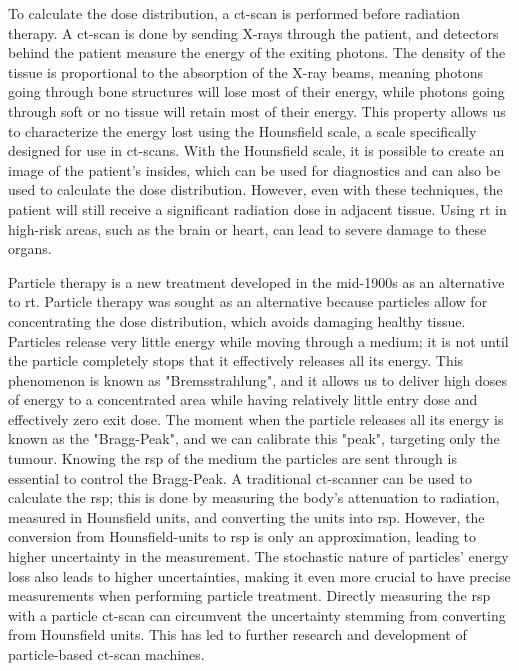 \documentclass[main.tex]{subfiles}
\begin{document}
To calculate the dose distribution, a \gls{ct}-scan is performed before radiation therapy. A \gls{ct}-scan is done by sending X-rays through the patient, and detectors behind the patient measure the energy of the exiting photons. The density of the tissue is proportional to the absorption of the X-ray beams, meaning photons going through bone structures will lose most of their energy, while photons going through soft or no tissue will retain most of their energy. This property allows us to characterize the energy lost using the Hounsfield scale, a scale specifically designed for use in \gls{ct}-scans. With the Hounsfield scale, it is possible to create an image of the patient's insides, which can be used for diagnostics and can also be used to calculate the dose distribution. However, even with these techniques, the patient will still receive a significant radiation dose in adjacent tissue. Using \gls{rt} in high-risk areas, such as the brain or heart, can lead to severe damage to these organs.  \par

Particle therapy is a new treatment developed in the mid-1900s as an alternative to \gls{rt}. Particle therapy was sought as an alternative because particles allow for concentrating the dose distribution, which avoids damaging healthy tissue. Particles release very little energy while moving through a medium; it is not until the particle completely stops that it effectively releases all its energy. This phenomenon is known as "Bremsstrahlung", and it allows us to deliver high doses of energy to a concentrated area while having relatively little entry dose and effectively zero exit dose. The moment when the particle releases all its energy is known as the "Bragg-Peak", and we can calibrate this "peak", targeting only the tumour. Knowing the \gls{rsp} of the medium the particles are sent through is essential to control the Bragg-Peak. A traditional \gls{ct}-scanner can be used to calculate the \gls{rsp}; this is done by measuring the body's attenuation to radiation, measured in Hounsfield units, and converting the units into \gls{rsp}. However, the conversion from Hounsfield-units to \gls{rsp} is only an approximation, leading to higher uncertainty in the measurement. The stochastic nature of particles' energy loss also leads to higher uncertainties, making it even more crucial to have precise measurements when performing particle treatment. Directly measuring the \gls{rsp} with a particle \gls{ct}-scan can circumvent the uncertainty stemming from converting from Hounsfield units. This has led to further research and development of particle-based \gls{ct}-scan machines.
\end{document}
